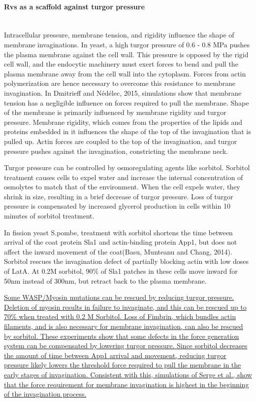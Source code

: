 	\paragraph{Rvs as a scaffold against turgor pressure} 
	
	\mbox{}\\
Intracellular pressure, membrane tension, and rigidity influence the shape of membrane invaginations. In yeast, a high turgor pressure of 0.6 - 0.8 MPa pushes the plasma membrane against the cell wall. This pressure is opposed by the rigid cell wall, and the endocytic machinery must exert forces to bend and pull the plasma membrane away from the cell wall into the cytoplasm. Forces from actin polymerization are hence necessary to overcome this resistance to membrane invagination. In Dmitrieff and Nédélec, 2015, simulations show that membrane tension has a negligible influence on forces required to pull the membrane. Shape of the membrane is primarily influenced by membrane rigidity and turgor pressure. Membrane rigidity, which comes from the properties of the lipids and proteins embedded in it influences the shape of the top of the invagination that is pulled up. Actin forces are coupled to the top of the invagination, and turgor pressure pushes against the invagination, constricting the membrane neck.  

Turgor pressure can be controlled by osmoregulating agents like sorbitol. Sorbitol treatment causes cells to expel water and increase the internal concentration of osmolytes to match that of the environment. When the cell expels water, they shrink in size, resulting in a brief decrease of turgor pressure. Loss of turgor pressure is compensated by increased glycerol production in cells within 10 minutes of sorbitol treatment.


In fission yeast S.pombe, treatment with sorbitol shortens the time between arrival of the coat protein Sla1 and actin-binding protein App1, but does not affect the inward movement of the coat(Basu, Munteanu and Chang, 2014). Sorbitol rescues the invagination defect of partially blocking actin with low doses of LatA. At 0.2M sorbitol, 90\% of Sla1 patches in these cells move inward for 50nm instead of 300nm, but retract back to the plasma membrane. 


\underline{Some WASP/Myosin mutations can be rescued by reducing turgor pressure. Deletion of myosin results in failure to invaginate, and this can be rescued up to 70\% when treated with 0.2 M Sorbitol. Loss of Fimbrin, which bundles actin filaments, and is also necessary for membrane invagination, can also be rescued by sorbitol.  These experiments show that some defects in the force generation system can be compensated by lowering turgor pressure.  Since sorbitol decreases the amount of time between App1 arrival and movement, reducing turgor pressure likely lowers the threshold force required to pull the membrane in the early stages of invagination. Consistent with this, simulations of Serge et al., show that the force requirement for membrane invagination is highest in the beginning of the invagination process.} 

